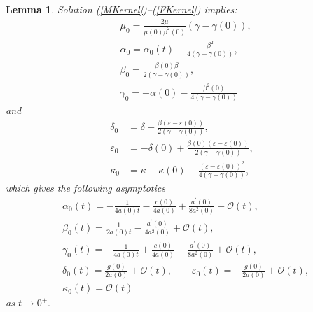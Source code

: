\documentclass[12pt,reqno]{amsart}
\theoremstyle{plain}
\newtheorem{lemma}{Lemma}
\numberwithin{equation}{section}
\begin{document}
\begin{lemma}
Solution (\ref{MKernel})--(\ref{FKernel}) implies:\begin{align}
& \mu _{0}=\frac{2\mu }{\mu \left( 0\right) \beta ^{2}\left( 0\right) }\left( \gamma -\gamma \left( 0\right) \right) ,  \label{M0} \\
& \alpha _{0}=\alpha _{0}\left( t\right) -\frac{\beta ^{2}}{4\left( \gamma
-\gamma \left( 0\right) \right) },  \label{AA0} \\
& \beta _{0}=\frac{\beta \left( 0\right) \beta }{2\left( \gamma -\gamma
\left( 0\right) \right) },  \label{BB0} \\
& \gamma _{0}=-\alpha \left( 0\right) -\frac{\beta ^{2}\left( 0\right) }{4\left( \gamma -\gamma \left( 0\right) \right) }  \label{CC0}
\end{align}and\begin{align}
\delta _{0}& =\delta -\frac{\beta \left( \varepsilon -\varepsilon \left(
0\right) \right) }{2\left( \gamma -\gamma \left( 0\right) \right) },
\label{DD0} \\
\varepsilon _{0}& =-\delta \left( 0\right) +\frac{\beta \left( 0\right)
\left( \varepsilon -\varepsilon \left( 0\right) \right) }{2\left( \gamma
-\gamma \left( 0\right) \right) },  \label{EE0} \\
\kappa _{0}& =\kappa -\kappa \left( 0\right) -\frac{\left( \varepsilon
-\varepsilon \left( 0\right) \right) ^{2}}{4\left( \gamma -\gamma \left(
0\right) \right) },  \label{FF0}
\end{align}which gives the following asymptotics\begin{align}
& \alpha _{0}\left( t\right) =-\frac{1}{4a\left( 0\right) t}-\frac{c\left(
0\right) }{4a\left( 0\right) }+\frac{a^{\prime }\left( 0\right) }{8a^{2}\left( 0\right) }+\mathcal{O}\left( t\right) ,  \label{AsA0} \\
& \beta _{0}\left( t\right) =\frac{1}{2a\left( 0\right) t}-\frac{a^{\prime
}\left( 0\right) }{4a^{2}\left( 0\right) }+\mathcal{O}\left( t\right) ,
\label{AsB0} \\
& \gamma _{0}\left( t\right) =-\frac{1}{4a\left( 0\right) t}+\frac{c\left(
0\right) }{4a\left( 0\right) }+\frac{a^{\prime }\left( 0\right) }{8a^{2}\left( 0\right) }+\mathcal{O}\left( t\right) ,  \label{AsC0} \\
& \delta _{0}\left( t\right) =\frac{g\left( 0\right) }{2a\left( 0\right) }+\mathcal{O}\left( t\right) ,\qquad \varepsilon _{0}\left( t\right) =-\frac{g\left( 0\right) }{2a\left( 0\right) }+\mathcal{O}\left( t\right) ,
\label{AsDE0} \\
& \kappa _{0}\left( t\right) =\mathcal{O}\left( t\right)  \label{AsF0}
\end{align}as $t\rightarrow 0^{+}.$
\end{lemma}
\end{document}
